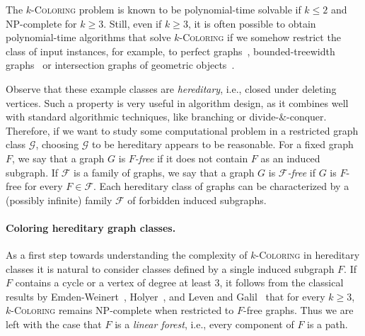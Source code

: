 \documentclass[11pt,a4paper]{article}
\theoremstyle{mystyle}
\newcommand{\colo}[1]{\ensuremath{#1}-\textsc{Coloring}\xspace}
\newcommand{\NP}{\textsf{NP}}
\begin{document}
The \colo{k} problem is known to be polynomial-time solvable if $k \leq 2$ and  \NP-complete for $k \geq 3$. 
Still, even if $k \geq 3$, it is often possible to obtain polynomial-time algorithms that solve \colo{k} if we somehow restrict the class of input instances, for example, to perfect graphs~\cite{DBLP:journals/combinatorica/GrotschelLS81,DBLP:journals/combinatorica/GrotschelLS84}, bounded-treewidth graphs~\cite{DBLP:journals/dam/ArnborgP89} or intersection graphs of geometric objects~\cite{DBLP:journals/siammax/GareyJMP80}.

Observe that these example classes are \emph{hereditary}, i.e., closed under deleting vertices.
Such a property is very useful in algorithm design, as it combines well with standard algorithmic techniques, like branching or divide-\&-conquer.
Therefore, if we want to study some computational problem in a restricted graph class $\mathcal{G}$,
choosing $\mathcal{G}$ to be hereditary appears to be reasonable.
For a fixed graph ${F}$, we say that a graph $G$ is \emph{$F$-free} if it does not contain $F$ as an induced subgraph.
If $\mathcal{F}$ is a family of graphs, we say that a graph $G$ is \emph{$\mathcal{F}$-free} if $G$ is $F$-free for every $F \in \mathcal{F}$.
Each hereditary class of graphs can be characterized by a (possibly infinite) family $\mathcal{F}$ of forbidden induced subgraphs. 

\label{sect:intro}
\paragraph{Coloring hereditary graph classes.}  
As a first step towards understanding the complexity of \colo{k} in hereditary classes it is natural to consider classes defined by a single induced subgraph $F$.
If $F$ contains a cycle or a vertex of degree at least 3, it follows from the classical results by Emden-Weinert~\cite{DBLP:journals/cpc/Emden-WeinertHK98}, Holyer~\cite{Holyer1981TheNO}, and Leven and Galil~\cite{DBLP:journals/jal/LevenG83} that for every $k \geq 3$, \colo{k} remains \NP-complete when restricted to $F$-free graphs.
Thus we are left with the case that $F$ is a \emph{linear forest}, i.e., every component of $F$ is a path.
\end{document}
